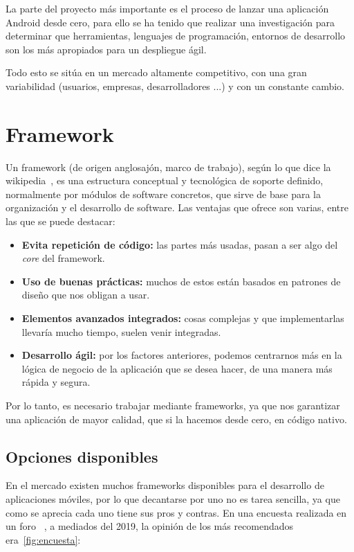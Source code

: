 
La parte del proyecto más importante es el proceso de lanzar una aplicación Android desde cero, para ello se ha tenido que realizar una investigación para determinar que herramientas, lenguajes de programación, entornos de desarrollo son los más apropiados para un despliegue ágil.

Todo esto se sitúa en un mercado altamente competitivo, con una gran variabilidad (usuarios, empresas, desarrolladores ...) y con un constante cambio. 

\section{Framework}
Un framework (de origen anglosajón, marco de trabajo), según lo que dice la wikipedia~\cite{wiki:framework}, es una estructura conceptual y tecnológica de soporte definido, normalmente por módulos de software concretos, que sirve de base para la organización y el desarrollo de software. Las ventajas que ofrece son varias, entre las que se puede destacar:

\begin{itemize}
	\item \textbf{Evita repetición de código:} las partes más usadas, pasan a ser algo del \emph{core} del framework.
	\item \textbf{Uso de buenas prácticas:} muchos de estos están basados en patrones de diseño que nos obligan a usar.
	\item \textbf{Elementos avanzados integrados:} cosas complejas y que implementarlas llevaría mucho tiempo, suelen venir integradas.
	\item \textbf{Desarrollo ágil:} por los factores anteriores, podemos centrarnos más en la lógica de negocio de la aplicación que se desea hacer, de una manera más rápida y segura.
\end{itemize}

Por lo tanto, es necesario trabajar mediante frameworks, ya que nos garantizar una aplicación de mayor calidad, que si la hacemos desde cero, en código nativo.

\subsection{Opciones disponibles}
En el mercado existen muchos frameworks disponibles para el desarrollo de aplicaciones móviles, por lo que decantarse por uno no es tarea sencilla, ya que como se aprecia cada uno tiene sus pros y contras. En una encuesta realizada en un foro ~\cite{foro:encuesta}, a mediados del 2019, la opinión de los más recomendados era~\ref{fig:encuesta}:

